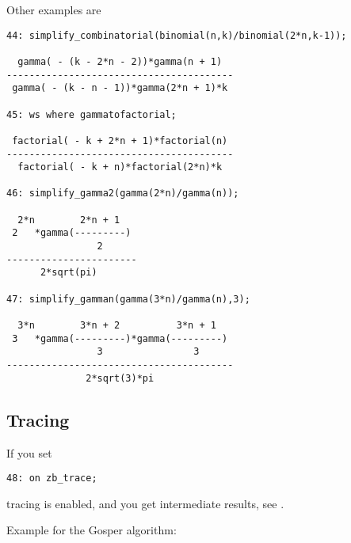 Other examples are

{\small
\begin{verbatim}
44: simplify_combinatorial(binomial(n,k)/binomial(2*n,k-1));

  gamma( - (k - 2*n - 2))*gamma(n + 1)
----------------------------------------
 gamma( - (k - n - 1))*gamma(2*n + 1)*k

45: ws where gammatofactorial;

 factorial( - k + 2*n + 1)*factorial(n)
----------------------------------------
  factorial( - k + n)*factorial(2*n)*k

46: simplify_gamma2(gamma(2*n)/gamma(n));

  2*n        2*n + 1
 2   *gamma(---------)
                2
-----------------------
      2*sqrt(pi)

47: simplify_gamman(gamma(3*n)/gamma(n),3);

  3*n        3*n + 2          3*n + 1
 3   *gamma(---------)*gamma(---------)
                3                3
----------------------------------------
              2*sqrt(3)*pi
\end{verbatim}
}\noindent

\subsection{Tracing}

If you set 
{\small
\begin{verbatim}
48: on zb_trace;
\end{verbatim}
}\noindent
tracing is enabled, and you get intermediate results, see \cite{Koepf}. 

Example for the Gosper algorithm:


